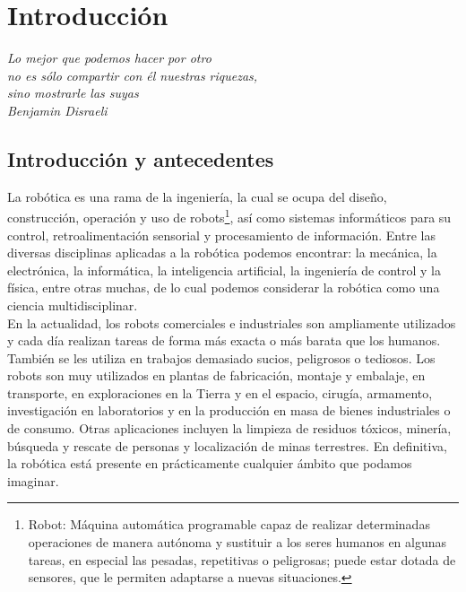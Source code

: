 

\newpage

\chapter{Introducción}
\label{chap:introducción}

\emph{Lo mejor que podemos hacer por otro\\ no es sólo compartir con él nuestras riquezas,\\ sino mostrarle las suyas\\ Benjamin Disraeli}\\


\section{Introducción y antecedentes}
\label{sec:introduccion_y_antecedentes}

La robótica es una rama de la ingeniería, la cual se ocupa del diseño, construcción, operación y uso de robots\footnote{Robot: Máquina automática programable capaz de 
realizar determinadas operaciones de manera autónoma y sustituir a los seres humanos en algunas tareas, en especial las pesadas, repetitivas o peligrosas; puede estar dotada de sensores, 
que le permiten adaptarse a nuevas situaciones.}, así como sistemas informáticos para su control, retroalimentación sensorial y procesamiento de información. Entre las diversas disciplinas aplicadas
a la robótica podemos encontrar: la mecánica, la electrónica, la informática, la inteligencia artificial, la ingeniería de control y la física, entre otras muchas, de lo cual podemos considerar 
la robótica como una ciencia multidisciplinar.\\

En la actualidad, los robots comerciales e industriales son ampliamente utilizados y cada día realizan tareas de forma más exacta o más barata que los humanos. También se les utiliza en trabajos demasiado sucios,
peligrosos o tediosos. Los robots son muy utilizados en plantas de fabricación, montaje y embalaje, en transporte, en exploraciones en la Tierra y en el espacio, cirugía, armamento, investigación en laboratorios y 
en la producción en masa de bienes industriales o de consumo. Otras aplicaciones incluyen la limpieza de residuos tóxicos, minería, búsqueda y rescate de personas y localización de minas terrestres. En definitiva, 
la robótica está presente en prácticamente cualquier ámbito que podamos imaginar.\\

